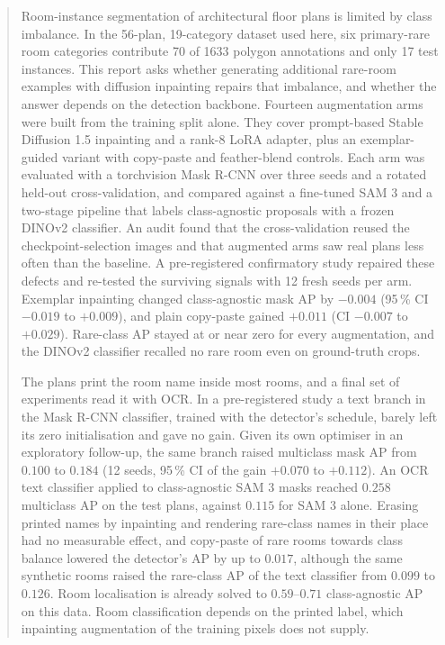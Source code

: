 \documentclass{article}
\begin{document}
\begin{abstract}
Room-instance segmentation of architectural floor plans is limited by class
imbalance. In the 56-plan, 19-category dataset used here, six primary-rare room
categories contribute 70 of 1633 polygon annotations and only 17 test instances.
This report asks whether generating additional rare-room examples with diffusion
inpainting repairs that imbalance, and whether the answer depends on the
detection backbone. Fourteen augmentation arms were built from the training
split alone. They cover prompt-based Stable Diffusion 1.5 inpainting and a
rank-8 LoRA adapter, plus an exemplar-guided variant with copy-paste and
feather-blend controls. Each arm was evaluated with a torchvision Mask R-CNN over three
seeds and a rotated held-out cross-validation, and compared against a fine-tuned
SAM 3 and a two-stage pipeline that labels class-agnostic proposals with a
frozen DINOv2 classifier. An audit found that the cross-validation reused the
checkpoint-selection images and that augmented arms saw real plans less often
than the baseline. A pre-registered confirmatory study repaired these defects
and re-tested the surviving signals with 12 fresh seeds per arm. Exemplar
inpainting changed class-agnostic mask AP by $-0.004$ (95\,\% CI $-0.019$ to
$+0.009$), and plain copy-paste gained $+0.011$ (CI $-0.007$ to $+0.029$).
Rare-class AP stayed at or near zero for every augmentation, and the DINOv2
classifier recalled no rare room even on ground-truth crops.

The plans print the room name inside most rooms, and a final set of
experiments read it with OCR. In a pre-registered study a text branch in the Mask R-CNN
classifier, trained with the detector's schedule, barely left its zero
initialisation and gave no gain. Given its own optimiser in an exploratory
follow-up, the same branch raised multiclass mask AP from $0.100$ to $0.184$
(12 seeds, 95\,\% CI of the gain $+0.070$ to $+0.112$). An OCR text classifier
applied to class-agnostic SAM 3 masks reached $0.258$ multiclass AP on the test
plans, against $0.115$ for SAM 3 alone. Erasing printed names by inpainting and
rendering rare-class names in their place had no measurable effect, and
copy-paste of rare rooms towards class balance lowered the detector's AP by up
to $0.017$, although the same synthetic rooms raised the rare-class AP of the
text classifier from $0.099$ to $0.126$.
Room localisation is already solved to $0.59$--$0.71$ class-agnostic AP on this
data. Room classification depends on the printed label, which inpainting
augmentation of the training pixels does not supply.
\end{abstract}
\end{document}

